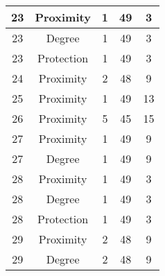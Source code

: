 \documentclass[results.tex]{subfiles}
\begin{document}
\begin{center}
\begin{tabular}{| c || c | c | c | c |}
            \hline
            23                      & Proximity                    & 1                      & 49                      & 3                    \\
            \hline
            23                      & Degree                       & 1                      & 49                      & 3                    \\
            \hline
            23                      & Protection                   & 1                      & 49                      & 3                    \\
            \hline
            24                      & Proximity                    & 2                      & 48                      & 9                    \\
            \hline
            25                      & Proximity                    & 1                      & 49                      & 13                   \\
            \hline
            26                      & Proximity                    & 5                      & 45                      & 15                   \\
            \hline
            27                      & Proximity                    & 1                      & 49                      & 9                    \\
            \hline
            27                      & Degree                       & 1                      & 49                      & 9                    \\
            \hline
            28                      & Proximity                    & 1                      & 49                      & 3                    \\
            \hline
            28                      & Degree                       & 1                      & 49                      & 3                    \\
            \hline
            28                      & Protection                   & 1                      & 49                      & 3                    \\
            \hline
            29                      & Proximity                    & 2                      & 48                      & 9                    \\
            \hline
            29                      & Degree                       & 2                      & 48                      & 9                    \\

\end{tabular}
\end{center}
\end{document}
